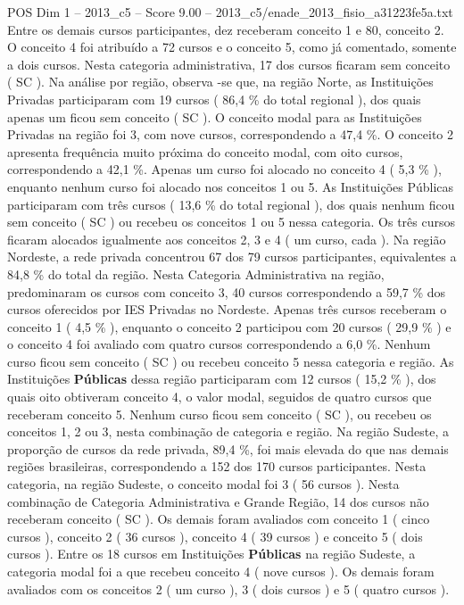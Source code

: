 \begin{textsample}{POS Dim 1 – 2013\_c5 – Score 9.00 – 2013\_c5/enade\_2013\_fisio\_a31223fe5a.txt}
Entre os demais cursos participantes, dez receberam conceito 1 e 80, conceito 2.
O conceito 4 foi atribuído a 72 cursos e o conceito 5, como já comentado, somente a dois cursos.
Nesta categoria administrativa, 17 dos cursos ficaram sem conceito ( SC ).
Na análise por região, observa -se que, na região Norte, as Instituições Privadas participaram com 19 cursos ( 86,4 \% do total regional ), dos quais apenas um ficou sem conceito ( SC ).
O conceito modal para as Instituições Privadas na região foi 3, com nove cursos, correspondendo a 47,4 \%.
O conceito 2 apresenta frequência muito próxima do conceito modal, com oito cursos, correspondendo a 42,1 \%.
Apenas um curso foi alocado no conceito 4 ( 5,3 \% ), enquanto nenhum curso foi alocado nos conceitos 1 ou 5.
As Instituições Públicas participaram com três cursos ( 13,6 \% do total regional ), dos quais nenhum ficou sem conceito ( SC ) ou recebeu os conceitos 1 ou 5 nessa categoria.
Os três cursos ficaram alocados igualmente aos conceitos 2, 3 e 4 ( um curso, cada ).
Na região Nordeste, a rede privada concentrou 67 dos 79 cursos participantes, equivalentes a 84,8 \% do total da região.
Nesta Categoria Administrativa na região, predominaram os cursos com conceito 3, 40 cursos correspondendo a 59,7 \% dos cursos oferecidos por IES Privadas no Nordeste.
Apenas três cursos receberam o conceito 1 ( 4,5 \% ), enquanto o conceito 2 participou com 20 cursos ( 29,9 \% ) e o conceito 4 foi avaliado com quatro cursos correspondendo a 6,0 \%.
Nenhum curso ficou sem conceito ( SC ) ou recebeu conceito 5 nessa categoria e região.
As Instituições \textbf{Públicas} dessa região participaram com 12 cursos ( 15,2 \% ), dos quais oito obtiveram conceito 4, o valor modal, seguidos de quatro cursos que receberam conceito 5.
Nenhum curso ficou sem conceito ( SC ), ou recebeu os conceitos 1, 2 ou 3, nesta combinação de categoria e região.
Na região Sudeste, a proporção de cursos da rede privada, 89,4 \%, foi mais elevada do que nas demais regiões brasileiras, correspondendo a 152 dos 170 cursos participantes.
Nesta categoria, na região Sudeste, o conceito modal foi 3 ( 56 cursos ).
Nesta combinação de Categoria Administrativa e Grande Região, 14 dos cursos não receberam conceito ( SC ).
Os demais foram avaliados com conceito 1 ( cinco cursos ), conceito 2 ( 36 cursos ), conceito 4 ( 39 cursos ) e conceito 5 ( dois cursos ).
Entre os 18 cursos em Instituições \textbf{Públicas} na região Sudeste, a categoria modal foi a que recebeu conceito 4 ( nove cursos ).
Os demais foram avaliados com os conceitos 2 ( um curso ), 3 ( dois cursos ) e 5 ( quatro cursos ).

\end{textsample}

